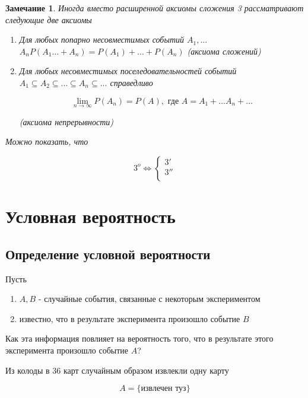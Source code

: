 \documentclass[a4paper, 14pt]{report}
\newtheorem{note}{Замечание}[section]
\begin{document}
\begin{note}
    Иногда вместо расширенной аксиомы сложения 3 рассматривают следующие две аксиомы

    \begin{enumerate}
        \item[3')] Для любых попарно несовместимых событий $A_1,...$ $A_n P(A_1...+A_n) = P(A_1) + ... + P(A_n)$ (аксиома сложений)

        \item[3'')] Для любых несовместимых поселедовательностей событий $A_1 \subseteq A_2 \subseteq ... \subseteq A_n \subseteq ...$ справедливо

            $$
            \lim_{n \to \infty} P(A_n) = P(A), \text{ где } A = A_1 + ... A_n + ...
            $$

            (аксиома непрерывности)
    \end{enumerate}

    Можно показать, что

    $$
    3^o \Leftrightarrow
    \begin{cases}
        3' \\
        3'' \\
    \end{cases}
    $$
\end{note}

\section{Условная вероятность}

\subsection{Определение условной вероятности}

Пусть 

\begin{enumerate}
    \item $A, B$ - случайные события, связанные с некоторым экспериментом
    \item известно, что в результате эксперимента произошло событие $B$ 
\end{enumerate}

Как эта информация повлияет на вероятность того, что в результате этого эксперимента произошло событие $A$?

Из колоды в 36 карт случайным образом извлекли одну карту

$$
A = \{ \text{извлечен туз} \}
$$
\end{document}
